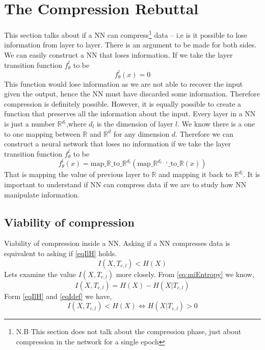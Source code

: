 \documentclass[dissertation.tex]{subfiles}
\begin{document}
\section{The Compression Rebuttal}

This section talks about if a NN can compress\footnote{ N.B This section does
not talk about the compression phase, just about compression in the network for
a single epoch } data -- i.e is it possible to lose information from layer to
layer. There is an argument to be made for both sides. We can easily construct a
NN that loses information. If we take the layer transition function $f_\theta^l$
to be
\begin{equation*}
  f_\theta^{l}(x) = 0
\end{equation*}
This function would lose information as we are not able to recover the input
given the output, hence the NN must have discarded some information. Therefore
compression is definitely possible. However, it is equally possible to create a
function that preserves all the information about the input. Every layer in a NN
is just a number $\mathbb{R}^{d_l}$,where $d_l$ is the dimension of layer $l$.
We know there is a one to one mapping between $\mathbb{R}$ and $\mathbb{R}^{d}$
for any dimension $d$. Therefore we can construct a neural network that loses no
information if we take the layer transition function $f_\theta^l$ to be
\begin{equation*}
  f_\theta^{l}(x) =
  \text{map}\_\mathbb{R}\_\text{to}\_\mathbb{R}^{d_l}(
  \text{map}\_\mathbb{R}^{d_{l-1}}\_\text{to}\_\mathbb{R}(x))
\end{equation*}
That is mapping the value of previous layer to $\mathbb{R}$ and mapping it back
to $\mathbb{R}^{d_l}$. It is important to understand if NN can compress data if
we are to study how NN manipulate information.

\subsection{Viability of compression} \label{subViabilityOfCompression}

Viability of compression inside a NN. Asking if a NN compresses data is
equivalent to asking if \autoref{eqIlH} holds.
\begin{equation} 
  I(X, T_{e,l}) < H(X)
  \label{eqIlH}
\end{equation}
Lets examine the value $I(X, T_{e,l})$ more closely. From
\autoref{eq:miEntropy} we know,
\begin{equation} 
  I(X,T_{e,l})=H(X)-H(X|T_{e,l})
  \label{eqIdef}
\end{equation}
Form \autoref{eqIlH} and \autoref{eqIdef} we have,
\begin{equation} 
  I(X, T_{e,l}) < H(X) 
  \Leftrightarrow 
  H(X|T_{e,l}) > 0
  \label{eqIHH}
\end{equation}
\end{document}
